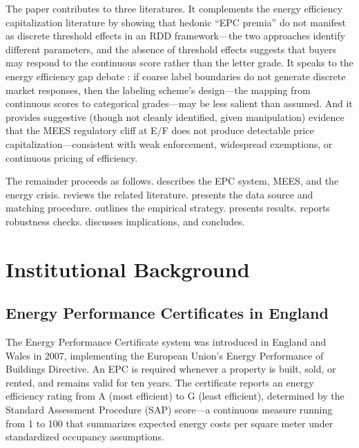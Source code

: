 \documentclass[12pt]{article}
\begin{document}
The paper contributes to three literatures. It complements the energy efficiency capitalization literature \citep{eichholtz2010doing, fuerst2015does, aydin2020capitalization} by showing that hedonic ``EPC premia'' do not manifest as discrete threshold effects in an RDD framework---the two approaches identify different parameters, and the absence of threshold effects suggests that buyers may respond to the continuous score rather than the letter grade. It speaks to the energy efficiency gap debate \citep{allcott2014consumers, gerarden2017assessing}: if coarse label boundaries do not generate discrete market responses, then the labeling scheme's design---the mapping from continuous scores to categorical grades---may be less salient than assumed. And it provides suggestive (though not cleanly identified, given manipulation) evidence that the MEES regulatory cliff at E/F does not produce detectable price capitalization---consistent with weak enforcement, widespread exemptions, or continuous pricing of efficiency.

The remainder proceeds as follows.  describes the EPC system, MEES, and the energy crisis.  reviews the related literature.  presents the data source and matching procedure.  outlines the empirical strategy.  presents results.  reports robustness checks.  discusses implications, and  concludes.


\section{Institutional Background}\label{sec:background}

\subsection{Energy Performance Certificates in England}

The Energy Performance Certificate system was introduced in England and Wales in 2007, implementing the European Union's Energy Performance of Buildings Directive. An EPC is required whenever a property is built, sold, or rented, and remains valid for ten years. The certificate reports an energy efficiency rating from A (most efficient) to G (least efficient), determined by the Standard Assessment Procedure (SAP) score---a continuous measure running from 1 to 100 that summarizes expected energy costs per square meter under standardized occupancy assumptions.
\end{document}
